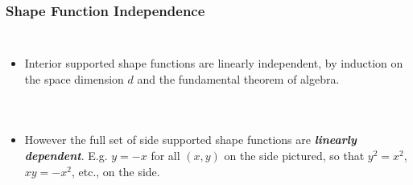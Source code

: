 \documentclass[compress]{beamer}
\begin{document}
\begin{frame}
  \frametitle{Shape Function Independence}
  \begin{columns}
      \pause
      \begin{itemize}[<+->]
        \item Interior supported shape functions are linearly independent, by induction on the space dimension $d$ and
          the fundamental theorem of algebra.
      \end{itemize}
  \end{columns}
  \uncover<+-> {
    \begin{columns}
      \begin{itemize}[<+->]
        \item However the full set of side supported shape functions are \emph{\textbf{linearly dependent}}. E.g. $y=-x$ for all $(x,y)$ on the side pictured,
          so that $y^2=x^2$, $x y = -x^2$, etc.,  on the side.
      \end{itemize}
    \end{columns}
  }
\end{frame}
\end{document}
